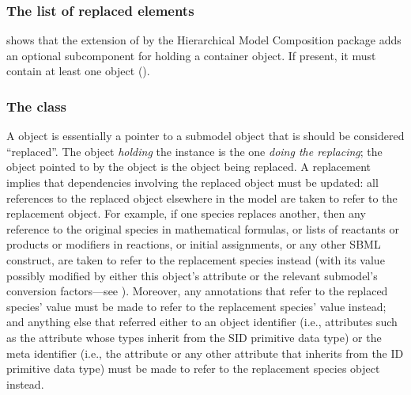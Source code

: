 \subsubsection{The list of replaced elements}

 shows that the extension of \SBase by the
Hierarchical Model Composition package adds an optional
 subcomponent for holding a
\ListOfReplacedElements container object.  If present, it must contain
at least one \ReplacedElement object ().


\subsubsection{The  class}
\label{replacedelement-class}
\label{listofreplacedelements-class}

A \ReplacedElement object is essentially a pointer to a submodel object
that is should be considered ``replaced''.  The object \emph{holding}
the \ReplacedElement instance is the one \emph{doing the replacing}; the
object pointed to by the \ReplacedElement object is the object being
replaced.  A replacement implies that dependencies involving the
replaced object must be updated: all references to the replaced object
elsewhere in the model are taken to refer to the replacement object.
For example, if one species replaces another, then any reference to the
original species in mathematical formulas, or lists of reactants or
products or modifiers in reactions, or initial assignments, or any other
SBML construct, are taken to refer to the replacement species instead
(with its value possibly modified by either this object's
 attribute or the relevant submodel's conversion
factors---see ). Moreover, any annotations
that refer to the replaced species'  value must be made to
refer to the replacement species'  value instead; and
anything else that referred either to an object identifier (i.e., 
attributes such as the  attribute whose types inherit from the SID 
primitive data type) or the meta identifier (i.e., the  attribute 
or any other attribute that inherits from the ID primitive data type) 
must be made to refer to the replacement species object instead. 

